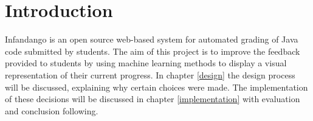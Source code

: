 \chapter{Introduction}
\label{introduction}
Infandango is an open source web-based system for automated grading of Java code submitted by students\cite{infandango_note}. The aim of this project is to improve the feedback provided to students by using machine learning methods to display a visual representation of their current progress. In chapter \ref{design} the design process will be discussed, explaining why certain choices were made. The implementation of these decisions will be discussed in chapter \ref{implementation} with evaluation and conclusion following.


